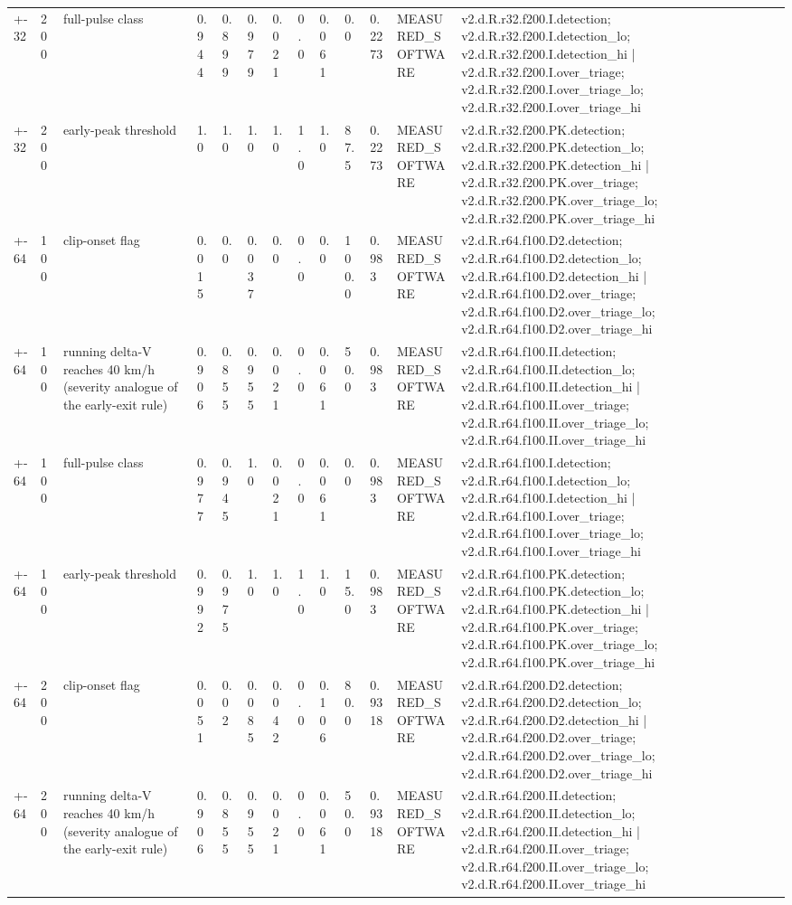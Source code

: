 \begin{table}[t]
\begin{tabular}{lllllllllllll}
+-32 & 200 & full-pulse class & 0.944 & 0.899 & 0.979 & 0.021 & 0.0 & 0.061 & 0.0 & 0.2273 & MEASURED\_SOFTWARE & v2.d.R.r32.f200.I.detection; v2.d.R.r32.f200.I.detection\_lo; v2.d.R.r32.f200.I.detection\_hi | v2.d.R.r32.f200.I.over\_triage; v2.d.R.r32.f200.I.over\_triage\_lo; v2.d.R.r32.f200.I.over\_triage\_hi \\
+-32 & 200 & early-peak threshold & 1.0 & 1.0 & 1.0 & 1.0 & 1.0 & 1.0 & 87.5 & 0.2273 & MEASURED\_SOFTWARE & v2.d.R.r32.f200.PK.detection; v2.d.R.r32.f200.PK.detection\_lo; v2.d.R.r32.f200.PK.detection\_hi | v2.d.R.r32.f200.PK.over\_triage; v2.d.R.r32.f200.PK.over\_triage\_lo; v2.d.R.r32.f200.PK.over\_triage\_hi \\
+-64 & 100 & clip-onset flag & 0.015 & 0.0 & 0.037 & 0.0 & 0.0 & 0.0 & 100.0 & 0.983 & MEASURED\_SOFTWARE & v2.d.R.r64.f100.D2.detection; v2.d.R.r64.f100.D2.detection\_lo; v2.d.R.r64.f100.D2.detection\_hi | v2.d.R.r64.f100.D2.over\_triage; v2.d.R.r64.f100.D2.over\_triage\_lo; v2.d.R.r64.f100.D2.over\_triage\_hi \\
+-64 & 100 & running delta-V reaches 40 km/h (severity analogue of the early-exit rule) & 0.906 & 0.855 & 0.955 & 0.021 & 0.0 & 0.061 & 50.0 & 0.983 & MEASURED\_SOFTWARE & v2.d.R.r64.f100.II.detection; v2.d.R.r64.f100.II.detection\_lo; v2.d.R.r64.f100.II.detection\_hi | v2.d.R.r64.f100.II.over\_triage; v2.d.R.r64.f100.II.over\_triage\_lo; v2.d.R.r64.f100.II.over\_triage\_hi \\
+-64 & 100 & full-pulse class & 0.977 & 0.945 & 1.0 & 0.021 & 0.0 & 0.061 & 0.0 & 0.983 & MEASURED\_SOFTWARE & v2.d.R.r64.f100.I.detection; v2.d.R.r64.f100.I.detection\_lo; v2.d.R.r64.f100.I.detection\_hi | v2.d.R.r64.f100.I.over\_triage; v2.d.R.r64.f100.I.over\_triage\_lo; v2.d.R.r64.f100.I.over\_triage\_hi \\
+-64 & 100 & early-peak threshold & 0.992 & 0.975 & 1.0 & 1.0 & 1.0 & 1.0 & 15.0 & 0.983 & MEASURED\_SOFTWARE & v2.d.R.r64.f100.PK.detection; v2.d.R.r64.f100.PK.detection\_lo; v2.d.R.r64.f100.PK.detection\_hi | v2.d.R.r64.f100.PK.over\_triage; v2.d.R.r64.f100.PK.over\_triage\_lo; v2.d.R.r64.f100.PK.over\_triage\_hi \\
+-64 & 200 & clip-onset flag & 0.051 & 0.02 & 0.085 & 0.042 & 0.0 & 0.106 & 80.0 & 0.9318 & MEASURED\_SOFTWARE & v2.d.R.r64.f200.D2.detection; v2.d.R.r64.f200.D2.detection\_lo; v2.d.R.r64.f200.D2.detection\_hi | v2.d.R.r64.f200.D2.over\_triage; v2.d.R.r64.f200.D2.over\_triage\_lo; v2.d.R.r64.f200.D2.over\_triage\_hi \\
+-64 & 200 & running delta-V reaches 40 km/h (severity analogue of the early-exit rule) & 0.906 & 0.855 & 0.955 & 0.021 & 0.0 & 0.061 & 50.0 & 0.9318 & MEASURED\_SOFTWARE & v2.d.R.r64.f200.II.detection; v2.d.R.r64.f200.II.detection\_lo; v2.d.R.r64.f200.II.detection\_hi | v2.d.R.r64.f200.II.over\_triage; v2.d.R.r64.f200.II.over\_triage\_lo; v2.d.R.r64.f200.II.over\_triage\_hi \\

\end{tabular}
\end{table}
